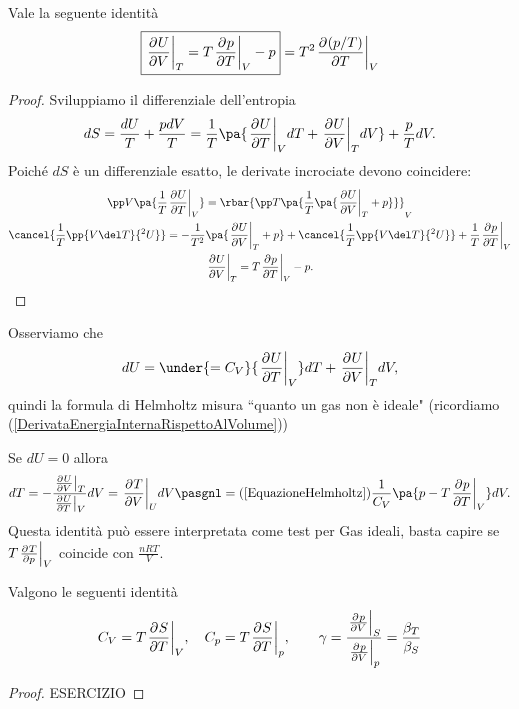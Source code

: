 \begin{proposition}\label{EquazioneHelmholtz}
Vale la seguente identit\`a
\[\boxed{\ppb VUT=T\ppb TpV-p}=T^2\ppb T{(p/T)}V\]
\end{proposition}
\begin{proof}
Sviluppiamo il differenziale dell'entropia
\[dS=\frac{dU}T+\frac{pdV}T=\frac1T\pa{\ppb TUVdT+\ppb VUTdV}+\frac pTdV.\]
Poich\'e $dS$ \`e un differenziale esatto, le derivate incrociate devono coincidere:
\begin{gather*}
\pp V{}\pa{\frac1T\ppb TUV}=\rbar{\pp T{}\pa{\frac1T\pa{\ppb VUT+p}}}_V\\
\cancel{\frac1T\pp{V\del T}{^2U}}=-\frac1{T^2}\pa{\ppb VUT+p}+\cancel{\frac1T\pp{V\del T}{^2U}}+\frac1T\ppb TpV\\
\ppb VUT=T\ppb TpV-p.
\end{gather*}
\end{proof}
\begin{remark}
Osserviamo che 
\[dU=\under{=C_V}{\ppb TUV}dT+\ppb VUTdV,\]
quindi la formula di Helmholtz misura ``quanto un gas non \`e ideale" (ricordiamo (\ref{DerivataEnergiaInternaRispettoAlVolume}))
\end{remark}
\begin{remark}
Se $dU=0$ allora
\[dT=-\frac{\ppb VUT}{\ppb TUV}dV=\ppb VTUdV\pasgnl={(\ref{EquazioneHelmholtz})}\frac1{C_V}\pa{p-T\ppb TpV}dV.\]
Questa identit\`a pu\`o essere interpretata come test per Gas ideali, basta capire se $T\ppb pTV$ coincide con $\frac{nRT}V$.
\end{remark}

\begin{remark}
Valgono le seguenti identit\`a
\[C_V=T\ppb TSV,\quad C_p=T\ppb TSp,\qquad \gamma=\frac{\ppb VpS}{\ppb Vpp}=\frac{\beta_T}{\beta_S}\]
\end{remark}
\begin{proof}
ESERCIZIO
\end{proof}


